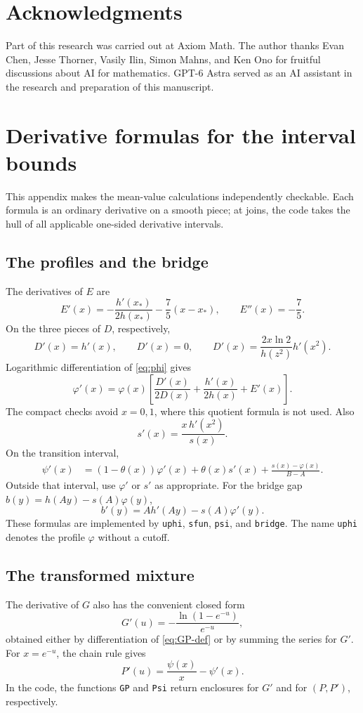 \documentclass[11pt]{article}
\theoremstyle{remark}
\begin{document}
\section*{Acknowledgments}
Part of this research was carried out at Axiom Math. The author
thanks Evan Chen, Jesse Thorner, Vasily Ilin, Simon Mahns, and Ken Ono
for fruitful discussions about AI for mathematics.
GPT-6 Astra served as an AI assistant in the research and preparation of
this manuscript.

\appendix
\section{Derivative formulas for the interval bounds}\label{app:derivatives}

This appendix makes the mean-value calculations independently
checkable. Each formula is an ordinary derivative on a smooth piece;
at joins, the code takes the hull of all applicable one-sided
derivative intervals.

\subsection{The profiles and the bridge}
The derivatives of \(E\) are
\[
E'(x)=-\frac{h'(x_*)}{2h(x_*)}-\frac75(x-x_*),
\qquad E''(x)=-\frac75.
\]
On the three pieces of \(D\), respectively,
\[
D'(x)=h'(x),\qquad D'(x)=0,\qquad
D'(x)=\frac{2x\ln2}{h(z^2)}h'(x^2).
\]
Logarithmic differentiation of \eqref{eq:phi} gives
\begin{equation}\label{eq:phiprime}
\varphi'(x)=\varphi(x)
\left[\frac{D'(x)}{2D(x)}+\frac{h'(x)}{2h(x)}+E'(x)\right].
\end{equation}
The compact checks avoid \(x=0,1\), where this quotient formula
is not used. Also
\[
s'(x)=\frac{x\,h'(x^2)}{s(x)}.
\]
On the transition interval,
\begin{align*}
\psi'(x)
&=(1-\theta(x))\varphi'(x)+\theta(x)s'(x)
+\frac{s(x)-\varphi(x)}{B-A}.
\end{align*}
Outside that interval, use \(\varphi'\) or \(s'\) as appropriate.
For the bridge gap \(b(y)=h(Ay)-s(A)\varphi(y)\),
\[
b'(y)=A h'(Ay)-s(A)\varphi'(y).
\]
These formulas are implemented by \texttt{uphi}, \texttt{sfun},
\texttt{psi}, and \texttt{bridge}. The name \texttt{uphi} denotes
the profile \(\varphi\) without a cutoff.

\subsection{The transformed mixture}
The derivative of \(G\) also has the convenient closed form
\[
G'(u)=-\frac{\ln(1-e^{-u})}{e^{-u}},
\]
obtained either by differentiation of \eqref{eq:GP-def} or by
summing the series for \(G'\).
For \(x=e^{-u}\), the chain rule gives
\[
P'(u)=\frac{\psi(x)}x-\psi'(x).
\]
In the code, the functions \texttt{GP} and \texttt{Psi} return
enclosures for \(G'\) and for \((P,P')\), respectively.
\end{document}
